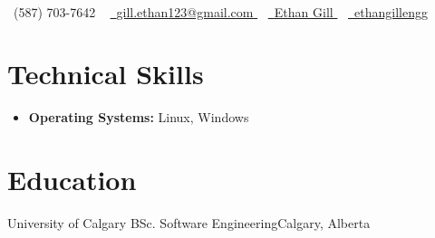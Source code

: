 

\begin{center}
	{\Huge \scshape \color{base07}{Ethan Gill}} \\ \vspace{4pt}
	\small \raisebox{-0.1\height}\faPhone\ (587) 703-7642 ~
	\href{mailto:gill.ethan123@gmail.com}{
		\raisebox{-0.2\height}\faEnvelope\  \underline{gill.ethan123@gmail.com}
	} ~
	\href{https://www.linkedin.com/in/ethan-gill-008a00258/}{
		\raisebox{-0.2\height}\faLinkedin\ \underline{Ethan Gill}
	} ~
	\href{https://github.com/ethangillengg}{
		\raisebox{-0.2\height}\faGithub\ \underline{ethangillengg}
	} 
	\vspace{-4pt}
\end{center}

\section{Technical Skills}
\begin{itemize}[leftmargin=0.15in, label={}, itemsep=1pt]
	\item{\textbf{Operating Systems:} Linux, Windows}
\end{itemize}

\section{Education}
\resumeSubHeadingListStart
\resumeSubheading
{University of Calgary}{}
{BSc. Software Engineering}{Calgary, Alberta}
\resumeItemListStart
{}
\resumeItemListEnd
\resumeSubHeadingListEnd
\vspace{-12pt}


